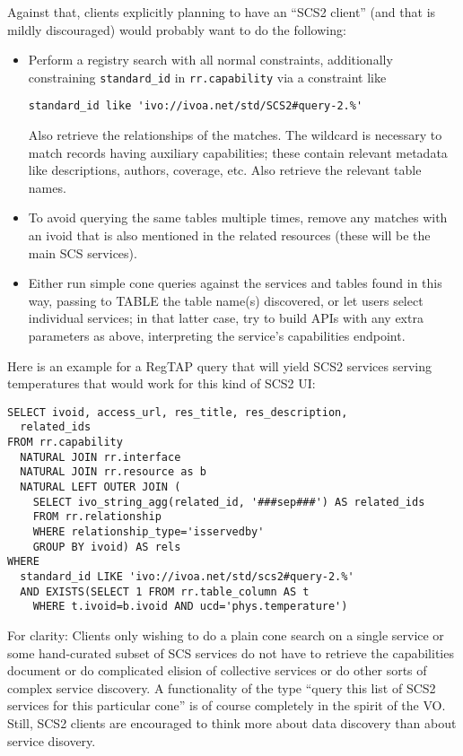 \documentclass[11pt,a4paper]{ivoa}
\begin{document}
Against that, clients explicitly planning to have an ``SCS2 client''
(and that is mildly discouraged) would probably want to do the
following:

\begin{itemize}
\item Perform a registry search with all normal constraints, additionally
constraining \verb|standard_id| in \verb|rr.capability| via a constraint
like
\begin{lstlisting}
standard_id like 'ivo://ivoa.net/std/SCS2#query-2.%'
\end{lstlisting}
Also retrieve the relationships of the matches.  The wildcard is
necessary to match records having auxiliary capabilities; these contain
relevant metadata like descriptions, authors, coverage, etc.  Also
retrieve the relevant table names.

\item To avoid querying the same tables multiple times, remove any
matches with an ivoid that is also mentioned in the related resources
(these will be the main SCS services).

\item Either run simple cone queries against the services and tables
found in this way, passing to TABLE the table name(s) discovered, or let
users select individual services; in that latter case, try to build APIs
with any extra parameters as above, interpreting the service's
capabilities endpoint.
\end{itemize}

Here is an example for a RegTAP query that will yield SCS2 services
serving temperatures that would work for this kind of SCS2 UI:

\begin{lstlisting}
SELECT ivoid, access_url, res_title, res_description,
  related_ids
FROM rr.capability
  NATURAL JOIN rr.interface
  NATURAL JOIN rr.resource as b
  NATURAL LEFT OUTER JOIN (
    SELECT ivo_string_agg(related_id, '###sep###') AS related_ids
    FROM rr.relationship
    WHERE relationship_type='isservedby'
    GROUP BY ivoid) AS rels
WHERE
  standard_id LIKE 'ivo://ivoa.net/std/scs2#query-2.%'
  AND EXISTS(SELECT 1 FROM rr.table_column AS t
    WHERE t.ivoid=b.ivoid AND ucd='phys.temperature')
\end{lstlisting}

For clarity: Clients only wishing to do a plain cone search on a single
service or some hand-curated subset of SCS services do not have to
retrieve the capabilities document or do complicated elision of
collective services or do other sorts of complex service discovery.  A
functionality of the type ``query this list of SCS2 services for this
particular cone'' is of course completely in the spirit of the VO.
Still, SCS2 clients are encouraged to think more about data discovery
than about service disovery.
\end{document}
